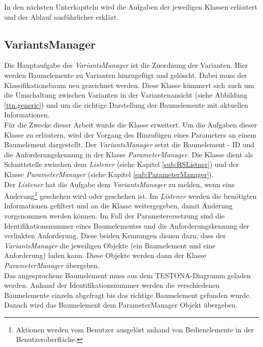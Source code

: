 In den nächsten Unterkapiteln wird die Aufgaben der jeweiligen Klassen erläutert und der Ablauf ausführlicher erklärt.


\subsection{VariantsManager}\label{sub.VariantsManager}
Die Hauptaufgabe des \textit{VariantsManager} ist die Zuordnung der Varianten. Hier werden Baumelemente zu Varianten hinzugefügt und gelöscht. Dabei muss der Klassifikationsbaum neu gezeichnet werden. Diese Klasse kümmert sich auch um die Umschaltung zwischen Varianten in der Variantenansicht (siehe Abbildung \ref{ttn.generic}) und um die richtige Darstellung der Baumelemente mit aktuellen Informationen.\\


Für die  Zwecke dieser Arbeit wurde die Klasse erweitert. Um die Aufgaben dieser Klasse zu erläutern, wird der Vorgang des Hinzufügen eines Parameters an einem Baumelement dargestellt. Der \textit{VariantsManager} setzt die Baumelement - ID und die Anforderungskennung in der Klasse \textit{ParameterManager}. Die Klasse dient als Schnittstelle zwischen dem \textit{Listener} (siehe Kapitel \ref{sub:RSListner}) und der Klasse \textit{ParameterManager}  (siehe Kapitel \ref{sub:ParameterManager}).\\


Der \textit{Listener} hat die Aufgabe dem \textit{VariantsManager} zu melden, wenn eine Änderung\footnote{Aktionen werden vom Benutzer ausgelöst anhand von Bedienelemente in der Benutzeroberfläche.} geschehen wird oder geschehen ist. Im \textit{Listener} werden die benötigten Informationen gefiltert und an die Klasse weitergegeben, damit Änderung vorgenommen werden können. Im Fall der Parameterersetzung sind  die Identifikationsnummer eines Baumelementes und die Anforderungskennung der verlinkten Anforderung. Diese beiden Kennungen dienen dazu, dass der \textit{VariantsManager} die jeweiligen Objekte (ein Baumelement und eine Anforderung) laden kann. Diese Objekte werden dann der Klasse \textit{ParameterManager} übergeben.\\


Das angesprochene Baumelement muss aus dem TESTONA-Diagramm geladen werden. Anhand der Identifikationsnummer werden die verschiedenen Baumelemente einzeln abgefragt bis das richtige Baumelement gefunden wurde. Danach wird das Baumelement dem ParameterManager Objekt übergeben.\\


